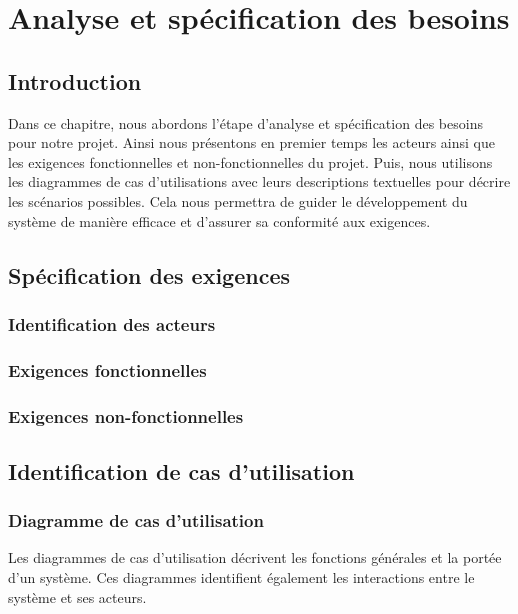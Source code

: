 
\chapter{Analyse et spécification des besoins}
\label{chap:Analyse et spécification des besoins}

\section*{Introduction}

Dans ce chapitre, nous abordons l’étape d’analyse et spécification des besoins pour notre projet. Ainsi nous présentons en premier temps les acteurs ainsi que les exigences fonctionnelles et non-fonctionnelles du projet. Puis, nous utilisons les diagrammes de cas d’utilisations avec leurs descriptions textuelles pour décrire les scénarios possibles. Cela nous permettra de guider le développement du système de manière efficace et d’assurer sa conformité aux exigences.

\pagebreak

\section{Spécification des exigences}

\subsection{Identification des acteurs}
\subsection{Exigences fonctionnelles}
\subsection{Exigences non-fonctionnelles}

\section{Identification de cas d’utilisation}

\subsection{Diagramme de cas d’utilisation}

Les diagrammes de cas d'utilisation décrivent les fonctions générales et la portée d'un système. Ces diagrammes identifient également les interactions entre le système et ses acteurs.

